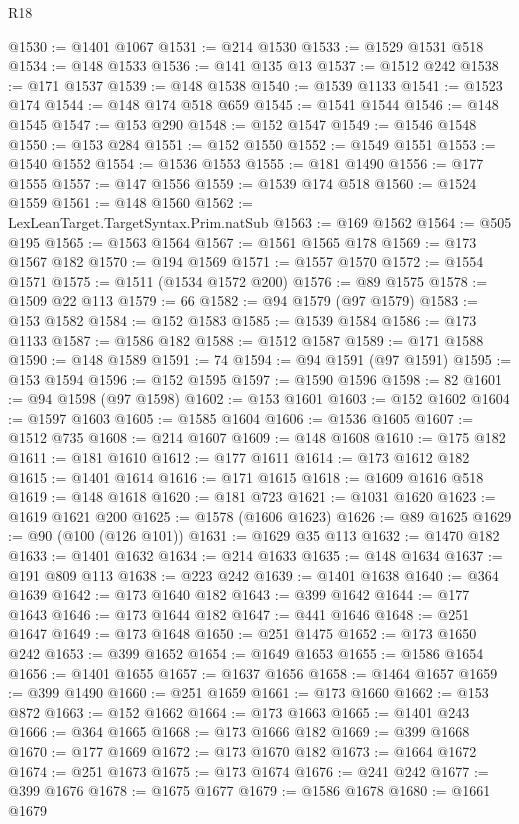 \begin{lexlean}{R18}
\begin{coremodule}
@1530 := @1401 @1067
@1531 := @214 @1530
@1533 := @1529 @1531 @518
@1534 := @148 @1533
@1536 := @141 @135 @13
@1537 := @1512 @242
@1538 := @171 @1537
@1539 := @148 @1538
@1540 := @1539 @1133
@1541 := @1523 @174
@1544 := @148 @174 @518 @659
@1545 := @1541 @1544
@1546 := @148 @1545
@1547 := @153 @290
@1548 := @152 @1547
@1549 := @1546 @1548
@1550 := @153 @284
@1551 := @152 @1550
@1552 := @1549 @1551
@1553 := @1540 @1552
@1554 := @1536 @1553
@1555 := @181 @1490
@1556 := @177 @1555
@1557 := @147 @1556
@1559 := @1539 @174 @518
@1560 := @1524 @1559
@1561 := @148 @1560
@1562 := LexLeanTarget.TargetSyntax.Prim.natSub
@1563 := @169 @1562
@1564 := @505 @195
@1565 := @1563 @1564
@1567 := @1561 @1565 @178
@1569 := @173 @1567 @182
@1570 := @194 @1569
@1571 := @1557 @1570
@1572 := @1554 @1571
@1575 := @1511 (@1534 @1572 @200)
@1576 := @89 @1575
@1578 := @1509 @22 @113
@1579 := 66
@1582 := @94 @1579 (@97 @1579)
@1583 := @153 @1582
@1584 := @152 @1583
@1585 := @1539 @1584
@1586 := @173 @1133
@1587 := @1586 @182
@1588 := @1512 @1587
@1589 := @171 @1588
@1590 := @148 @1589
@1591 := 74
@1594 := @94 @1591 (@97 @1591)
@1595 := @153 @1594
@1596 := @152 @1595
@1597 := @1590 @1596
@1598 := 82
@1601 := @94 @1598 (@97 @1598)
@1602 := @153 @1601
@1603 := @152 @1602
@1604 := @1597 @1603
@1605 := @1585 @1604
@1606 := @1536 @1605
@1607 := @1512 @735
@1608 := @214 @1607
@1609 := @148 @1608
@1610 := @175 @182
@1611 := @181 @1610
@1612 := @177 @1611
@1614 := @173 @1612 @182
@1615 := @1401 @1614
@1616 := @171 @1615
@1618 := @1609 @1616 @518
@1619 := @148 @1618
@1620 := @181 @723
@1621 := @1031 @1620
@1623 := @1619 @1621 @200
@1625 := @1578 (@1606 @1623)
@1626 := @89 @1625
@1629 := @90 (@100 (@126 @101))
@1631 := @1629 @35 @113
@1632 := @1470 @182
@1633 := @1401 @1632
@1634 := @214 @1633
@1635 := @148 @1634
@1637 := @191 @809 @113
@1638 := @223 @242
@1639 := @1401 @1638
@1640 := @364 @1639
@1642 := @173 @1640 @182
@1643 := @399 @1642
@1644 := @177 @1643
@1646 := @173 @1644 @182
@1647 := @441 @1646
@1648 := @251 @1647
@1649 := @173 @1648
@1650 := @251 @1475
@1652 := @173 @1650 @242
@1653 := @399 @1652
@1654 := @1649 @1653
@1655 := @1586 @1654
@1656 := @1401 @1655
@1657 := @1637 @1656
@1658 := @1464 @1657
@1659 := @399 @1490
@1660 := @251 @1659
@1661 := @173 @1660
@1662 := @153 @872
@1663 := @152 @1662
@1664 := @173 @1663
@1665 := @1401 @243
@1666 := @364 @1665
@1668 := @173 @1666 @182
@1669 := @399 @1668
@1670 := @177 @1669
@1672 := @173 @1670 @182
@1673 := @1664 @1672
@1674 := @251 @1673
@1675 := @173 @1674
@1676 := @241 @242
@1677 := @399 @1676
@1678 := @1675 @1677
@1679 := @1586 @1678
@1680 := @1661 @1679

\end{coremodule}
\end{lexlean}
